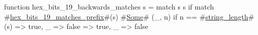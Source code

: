 function hex_bits_19_backwards_matches s = match s {
  s if match #\hyperref[sailRISCVzhexzybitszy19zymatcheszyprefix]{hex\_bits\_19\_matches\_prefix}#(s) {
    #\hyperref[sailRISCVzSome]{Some}# (_, n) if n == #\hyperref[sailRISCVzstringzylength]{string\_length}#(s) => true,
    _ => false
  } => true,
  _ => false
}
